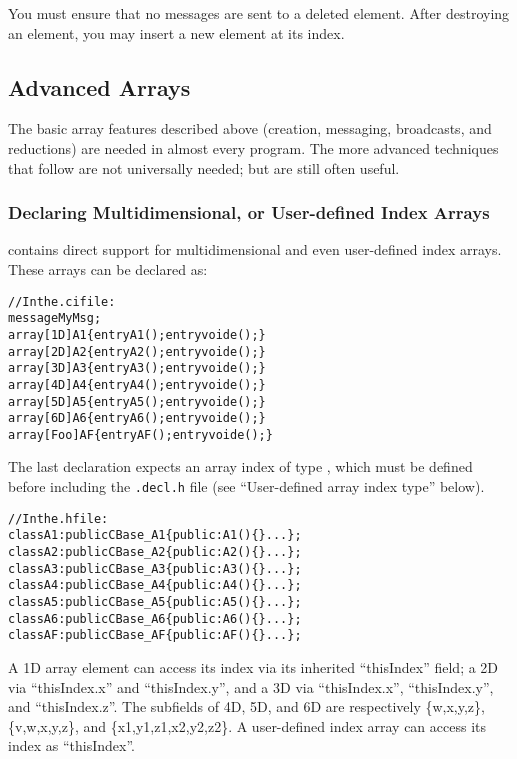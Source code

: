 You must ensure that no messages are sent to a deleted element. 
After destroying an element, you may insert a new element at
its index.




\subsection{Advanced Arrays}
\label{advanced arrays}

The basic array features described above (creation, messaging,
broadcasts, and reductions) are needed in almost every
\charmpp{} program.  The more advanced techniques that follow
are not universally needed; but are still often useful.


\subsubsection{Declaring Multidimensional, or User-defined Index Arrays}

\charmpp{} contains direct support for multidimensional and
even user-defined index arrays.  These arrays can be declared as:

\begin{alltt}
//In the .ci file:
message MyMsg;
array [1D] A1 \{ entry A1(); entry void e();\}
array [2D] A2 \{ entry A2(); entry void e();\}
array [3D] A3 \{ entry A3(); entry void e();\}
array [4D] A4 \{ entry A4(); entry void e();\}
array [5D] A5 \{ entry A5(); entry void e();\}
array [6D] A6 \{ entry A6(); entry void e();\}
array [Foo] AF \{ entry AF(); entry void e();\}
\end{alltt}

The last declaration expects an array index of type ,
which must be defined before including the \texttt{.decl.h} file 
(see ``User-defined array index type'' below).  

\begin{alltt}
//In the .h file:
class A1 : public CBase\_A1 \{ public: A1()\{\} ...\};
class A2 : public CBase\_A2 \{ public: A2()\{\} ...\};
class A3 : public CBase\_A3 \{ public: A3()\{\} ...\};
class A4 : public CBase\_A4 \{ public: A4()\{\} ...\};
class A5 : public CBase\_A5 \{ public: A5()\{\} ...\};
class A6 : public CBase\_A6 \{ public: A6()\{\} ...\};
class AF : public CBase\_AF \{ public: AF()\{\} ...\};
\end{alltt}

A 1D array element can access its index via its inherited ``thisIndex''
field; a 2D via ``thisIndex.x'' and ``thisIndex.y'', and a 3D via
``thisIndex.x'', ``thisIndex.y'', and ``thisIndex.z''. The subfields
of 4D, 5D, and 6D are respectively \{w,x,y,z\}, \{v,w,x,y,z\}, and 
\{x1,y1,z1,x2,y2,z2\}.
A user-defined index array can access its index as ``thisIndex''.


